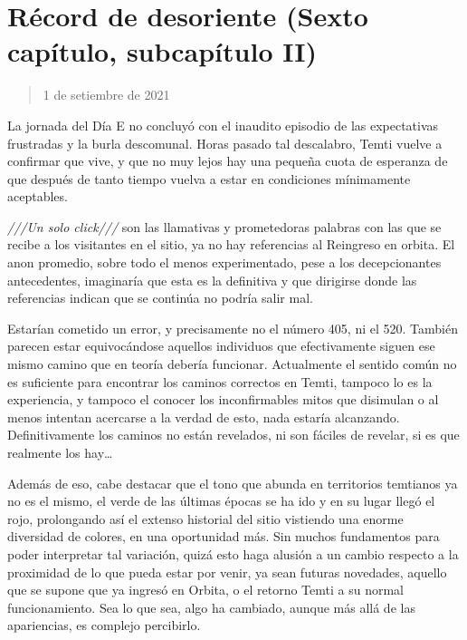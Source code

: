\documentclass[
  spanish,
]{book}
\begin{document}
\hypertarget{ruxe9cord-de-desoriente-sexto-capuxedtulo-subcapuxedtulo-ii}{%
\section{Récord de desoriente (Sexto capítulo, subcapítulo II)}\label{ruxe9cord-de-desoriente-sexto-capuxedtulo-subcapuxedtulo-ii}}

\begin{quote}
1 de setiembre de 2021
\end{quote}

La jornada del Día E no concluyó con el inaudito episodio de las expectativas frustradas y la burla descomunal. Horas pasado tal descalabro, Temti vuelve a confirmar que vive, y que no muy lejos hay una pequeña cuota de esperanza de que después de tanto tiempo vuelva a estar en condiciones mínimamente aceptables.

\emph{///Un solo click///} son las llamativas y prometedoras palabras con las que se recibe a los visitantes en el sitio, ya no hay referencias al Reingreso en orbita. El anon promedio, sobre todo el menos experimentado, pese a los decepcionantes antecedentes, imaginaría que esta es la definitiva y que dirigirse donde las referencias indican que se continúa no podría salir mal.

Estarían cometido un error, y precisamente no el número 405, ni el 520. También parecen estar equivocándose aquellos individuos que efectivamente siguen ese mismo camino que en teoría debería funcionar. Actualmente el sentido común no es suficiente para encontrar los caminos correctos en Temti, tampoco lo es la experiencia, y tampoco el conocer los inconfirmables mitos que disimulan o al menos intentan acercarse a la verdad de esto, nada estaría alcanzando. Definitivamente los caminos no están revelados, ni son fáciles de revelar, si es que realmente los hay\ldots{}

Además de eso, cabe destacar que el tono que abunda en territorios temtianos ya no es el mismo, el verde de las últimas épocas se ha ido y en su lugar llegó el rojo, prolongando así el extenso historial del sitio vistiendo una enorme diversidad de colores, en una oportunidad más. Sin muchos fundamentos para poder interpretar tal variación, quizá esto haga alusión a un cambio respecto a la proximidad de lo que pueda estar por venir, ya sean futuras novedades, aquello que se supone que ya ingresó en Orbita, o el retorno Temti a su normal funcionamiento. Sea lo que sea, algo ha cambiado, aunque más allá de las apariencias, es complejo percibirlo.
\end{document}

